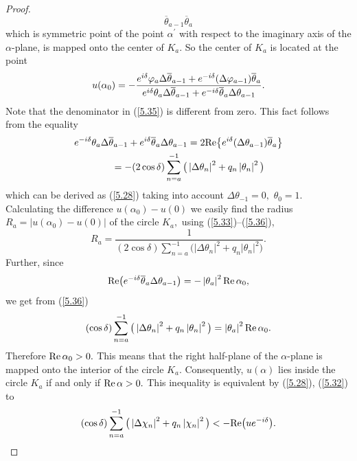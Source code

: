 \begin{proof}
\[{\overline{\theta }_{a-1}}{\overline{\theta }_{a}}
\]%
which is symmetric point of the point $\alpha ^{\prime }$ with respect to
the imaginary axis of the $\alpha $-plane, is mapped onto the center of $%
K_{a}.$ So the center of $K_{a}$ is located at the point%
\begin{equation}
u(\alpha _{0})=-\frac{e^{i\delta }\varphi _{a}\Delta \overline{\theta }%
_{a-1}+e^{-i\delta }(\Delta \varphi _{a-1})\overline{\theta }_{a}}{%
e^{i\delta }\theta _{a}\Delta \overline{\theta }_{a-1}+e^{-i\delta }%
\overline{\theta }_{a}\Delta \theta _{a-1}}.  \label{5.35}
\end{equation}%
Note that the denominator in (\ref{5.35}) is dif\/ferent from zero. This fact
follows from the equality%
\begin{gather}
e^{-i\delta }\theta _{a}\Delta \overline{\theta }_{a-1}+e^{i\delta }%
\overline{\theta }_{a}\Delta \theta _{a-1}=2{\rm Re}\big\{ e^{i\delta
}(\Delta \theta _{a-1})\overline{\theta }_{a}\big\}\nonumber\\
\qquad {}=-(2\cos \delta )\sum_{n=a}^{-1}\big( \left\vert \Delta \theta
_{n}\right\vert ^{2}+q_{n}\left\vert \theta _{n}\right\vert ^{2}\big)
\label{5.36}
\end{gather}%
which can be derived as (\ref{5.28}) taking into account $\Delta \theta
_{-1}=0,$ $\theta _{0}=1.$ Calculating the dif\/ference $u(\alpha _{0})-u(0)$
we easily f\/ind the radius $R_{a}=\left\vert u(\alpha _{0})-u(0)\right\vert $
of the circle $K_{a},$ using (\ref{5.33})--(\ref{5.36}),%
\[
R_{a}=\frac{1}{(2\cos \delta )\sum\limits_{n=a}^{-1}\big( \left\vert \Delta \theta
_{n}\right\vert ^{2}+q_{n}\left\vert \theta _{n}\right\vert ^{2}\big) }.
\]%
Further, since%
\[
{\rm Re}\big(e^{-i\delta }\overline{\theta }_{a}\Delta \theta
_{a-1}\big)=-\left\vert \theta _{a}\right\vert ^{2}{\rm Re}\,\alpha _{0},
\]%
we get from (\ref{5.36})%
\[
(\cos \delta )\sum_{n=a}^{-1}\big( \left\vert \Delta \theta _{n}\right\vert
^{2}+q_{n}\left\vert \theta _{n}\right\vert ^{2}\big) =\left\vert \theta
_{a}\right\vert ^{2}{\rm Re}\,\alpha _{0}.
\]%
Therefore ${\rm Re}\,\alpha _{0}>0.$ This means that the right half-plane
of the $\alpha $-plane is mapped onto the interior of the circle $K_{a}.$
Consequently, $u(\alpha )$ lies inside the circle $K_{a}$ if and only if $%
{\rm Re}\,\alpha >0.$ This inequality is equivalent by (\ref{5.28}), (\ref{5.32}) to
\begin{equation}
(\cos \delta )\sum_{n=a}^{-1}\big( \left\vert \Delta \chi _{n}\right\vert
^{2}+q_{n}\left\vert \chi _{n}\right\vert ^{2}\big) <-{\rm Re}
\big(ue^{-i\delta }\big).  \label{5.37}
\end{equation}


\end{proof}
